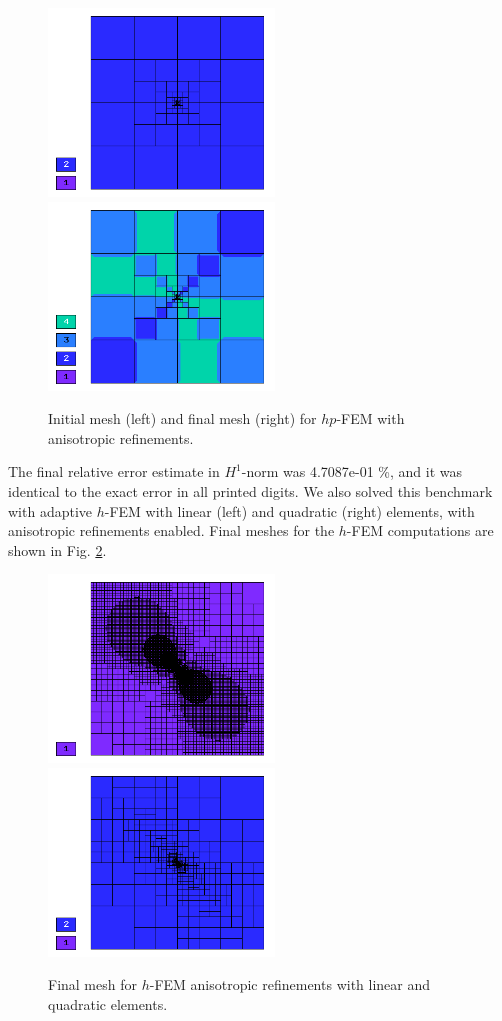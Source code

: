 \begin{figure}[!ht]
\centering
\includegraphics[height=5cm]{nist/nist-11/mesh_hp_aniso_init.png}\ \
\includegraphics[height=5cm]{nist/nist-11/mesh_hp_aniso.png}
\vspace{-2mm}
\caption{Initial mesh (left) and final mesh (right) for $hp$-FEM with anisotropic refinements.}
\label{fig:nist-11-hp-aniso}
\end{figure}

The final relative error estimate in $H^1$-norm was 4.7087e-01 \%,
and it was identical to the exact error in all printed digits.
We also solved this benchmark with adaptive $h$-FEM
with linear (left) and quadratic (right)
elements, with anisotropic refinements enabled.
Final meshes for the $h$-FEM computations are shown
in Fig. \ref{fig:nist-11-h-aniso}.

\begin{figure}[!ht]
\centering
\includegraphics[height=5cm]{nist/nist-11/mesh_h1_aniso.png}\ \
\includegraphics[height=5cm]{nist/nist-11/mesh_h2_aniso.png}
\vspace{-2mm}
\caption{Final mesh for $h$-FEM anisotropic refinements with linear and quadratic elements.}
\label{fig:nist-11-h-aniso}
\end{figure}

